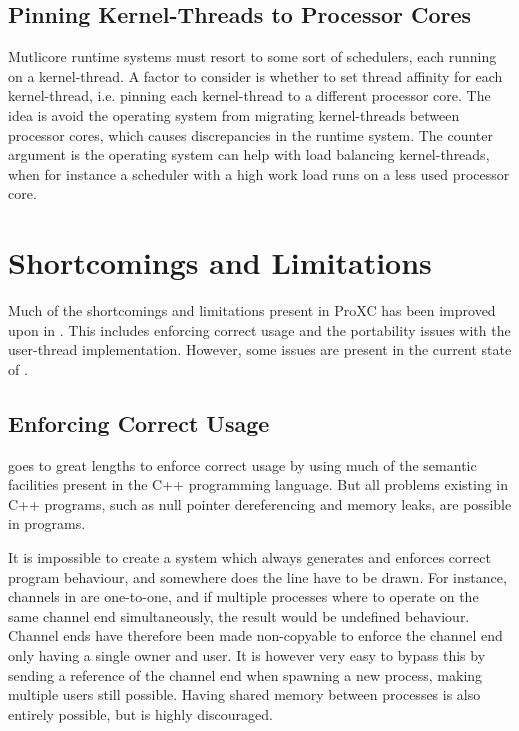 \section{Pinning Kernel\hyp{}Threads to Processor Cores}


Mutlicore runtime systems must resort to some sort of schedulers, each running on a kernel\hyp{}thread. A factor to consider is whether to set thread affinity for each kernel\hyp{}thread, i.e. pinning each kernel\hyp{}thread to a different processor core. The idea is avoid the operating system from migrating kernel\hyp{}threads between processor cores, which causes discrepancies in the runtime system. The counter argument is the operating system can help with load balancing kernel\hyp{}threads, when for instance a scheduler with a high work load runs on a less used processor core.


\chapter{Shortcomings and Limitations}
\label{ch:shortcomings_limitations}


Much of the shortcomings and limitations present in ProXC has been improved upon in \Proxc{}. This includes enforcing correct usage and the portability issues with the user\hyp{}thread implementation. However, some issues are present in the current state of \Proxc{}.


\section{Enforcing Correct Usage}


\Proxc{} goes to great lengths to enforce correct usage by using much of the semantic facilities present in the C++ programming language. But all problems existing in C++ programs, such as null pointer dereferencing and memory leaks, are possible in \Proxc{} programs.  

It is impossible to create a system which always generates and enforces correct program behaviour, and somewhere does the line have to be drawn. For instance, channels in \Proxc{} are one\hyp{}to\hyp{}one, and if multiple processes where to operate on the same channel end simultaneously, the result would be undefined behaviour. Channel ends have therefore been made non\hyp{}copyable to enforce the channel end only having a single owner and user. It is however very easy to bypass this by sending a reference of the channel end when spawning a new process, making multiple users still possible. Having shared memory between processes is also entirely possible, but is highly discouraged.

